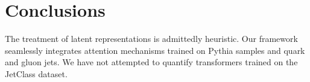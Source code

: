 \section{Conclusions}\label{sec:conclusions}

The treatment of latent representations is admittedly heuristic. Our
framework seamlessly integrates attention mechanisms trained on Pythia
samples and quark and gluon jets. We have not attempted to quantify
transformers trained on the JetClass dataset.

